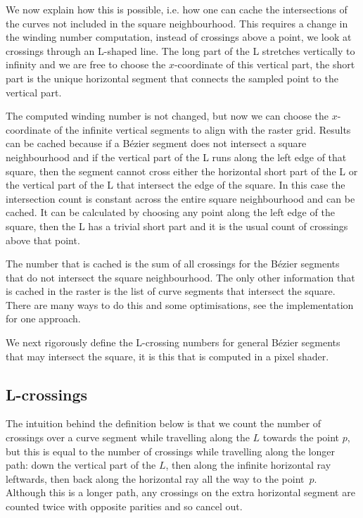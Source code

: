 \documentclass{article}
\begin{document}
We now explain how this is possible, i.e. how one can cache the intersections of the curves not included in the square neighbourhood.
This requires a change in the winding number computation, instead of crossings above a point, we look at crossings through an L-shaped line.
The long part of the L stretches vertically to infinity and we are free to choose the $x$-coordinate of this vertical part, the short part is the unique horizontal segment that connects the sampled point to the vertical part.

The computed winding number is not changed, but now we can choose the $x$-coordinate of the infinite vertical segments to align with the raster grid. 
Results can be cached because if a B\'ezier segment does not intersect a square neighbourhood and if the vertical part of the L runs along the left edge of that square, then the segment cannot cross either the horizontal short part of the L or the vertical part of the L that intersect the edge of the square.
In this case the intersection count is constant across the entire square neighbourhood and can be cached.
It can be calculated by choosing any point along the left edge of the square, then the L has a trivial short part and it is the usual count of crossings above that point.

The number that is cached is the sum of all crossings for the B\'ezier segments that do not intersect the square neighbourhood. The only other information that is cached in the raster is the list of curve segments that intersect the square.
There are many ways to do this and some optimisations, see the implementation for one approach.

We next rigorously define the L-crossing numbers for general B\'ezier segments that may intersect the square, it is this that is computed in a pixel shader.

\subsection{L-crossings}
The intuition behind the definition below is that we count the number of crossings over a curve segment while travelling along the $L$ towards the point $p$, but this is equal to the number of crossings while travelling along the longer path: down the vertical part of the $L$, then along the infinite horizontal ray leftwards, then back along the horizontal ray all the way to the point~$p$.
Although this is a longer path, any crossings on the extra horizontal segment are counted twice with opposite parities and so cancel out.
\end{document}
